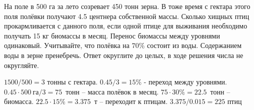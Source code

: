 
На поле в 500 га за лето созревает 450 тонн зерна. В тоже время с гектара этого поля полёвки получают 4.5 центнера 
собственной массы. Сколько хищных птиц прокармливается с данного поля, если одной птице для выживания необходимо получать 15 кг биомассы в месяц. Перенос биомассы между уровнями одинаковый. Учитывайте, что полёвка на $70\%$ состоит из воды. Содержанием воды в зерне пренебречь. Ответ округлите до целых, в ходе решения числа не округляйте.

\solutionSection

$1500/500 = 3$ тонны с гектара. $0.45/3 =15\%$ - переход между уровнями. \linebreak $0.45 \cdot 500 \: \text{га}/3=75$~тонн – масса 
полёвок в месяц. $75 \cdot 30\%= 22.5$~тонн – биомасса. $22.5 \cdot 15\% =3.375$~т – переходит к птицам. 
$3.375/0.015=225$ птиц

